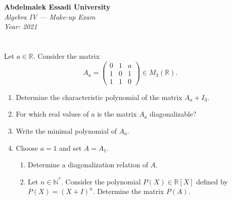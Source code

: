 \documentclass[12pt]{article}
\begin{document}
\begin{center}
  \Large\textbf{Abdelmalek Essadi University} \\[1em]
  \large\textit{Algebra IV — Make-up Exam} \\[0.5em]
  \large\textit{Year: 2021} \\[2em]
\end{center}

\vspace{0.5cm}

\section{}
Let $a \in \mathbb{R}$. Consider the matrix
\[
A_a = 
\begin{pmatrix}
0 & 1 & a \\
1 & 0 & 1 \\
1 & 1 & 0
\end{pmatrix}
\in M_3(\mathbb{R}).
\]

\begin{enumerate}
    \item[1)] Determine the characteristic polynomial of the matrix $A_a + I_3$.
    \item[2)] For which real values of $a$ is the matrix $A_a$ diagonalizable?
    \item[3)] Write the minimal polynomial of $A_a$.
    \item[4)] Choose $a = 1$ and set $A = A_1$.
    \begin{enumerate}
        \item[1)] Determine a diagonalization relation of $A$.
        \item[2)] Let $n \in \mathbb{N}^*$. Consider the polynomial $P(X) \in \mathbb{R}[X]$ defined by $P(X) = (X + I)^n$. Determine the matrix $P(A)$.
    \end{enumerate}
\end{enumerate}
\end{document}
